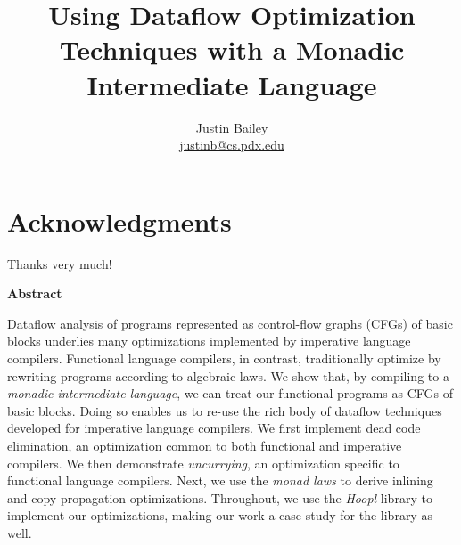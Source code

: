 \dodocclass



\date{}
\author{Justin Bailey \\ \url{justinb@cs.pdx.edu}}
\title{Using Dataflow Optimization Techniques with a Monadic Intermediate Language}
\maketitle 

\pagestyle{plain}
\section*{Acknowledgments}
Thanks very much!
\newpage

\begin{center}
  {\sffamily\bfseries Abstract}
\end{center}
\bigskip
\noindent
Dataflow analysis of programs represented as control-flow graphs
(CFGs) of basic blocks underlies many optimizations implemented by
imperative language compilers. Functional language compilers, in
contrast, traditionally optimize by rewriting programs according to
algebraic laws. We show that, by compiling to a \emph{monadic
  intermediate language}, we can treat our functional programs as CFGs
of basic blocks. Doing so enables us to re-use the rich body of
dataflow techniques developed for imperative language compilers. We
first implement dead code elimination, an optimization common to both
functional and imperative compilers. We then demonstrate
\emph{uncurrying}, an optimization specific to functional language
compilers. Next, we use the \emph{monad laws} to derive inlining and
copy-propagation optimizations.  Throughout, we use the \emph{Hoopl}
library to implement our optimizations, making our work a case-study
for the library as well.
\newpage

\singlespacing
\tableofcontents
\newpage
{}
\listoffigures
\newpage

